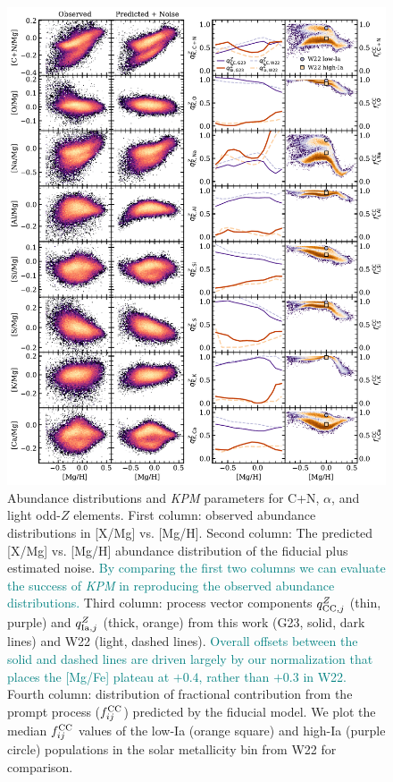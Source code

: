 \documentclass[modern]{aastex631}
\newcommand{\qcc}{q_{{\rm CC,}j}^{Z}}
\newcommand{\qIa}{q_{{\rm Ia,}j}^{Z}}
\newcommand{\fcc}{f_{ij}^{\rm CC}}
\newcommand{\add}[1]{\textcolor{teal}{#1}}
\newcommand{\name}{\textsl{KPM}}
\begin{document}
\begin{figure}[htb!]
    \centering
    \includegraphics[width=\textwidth]{Paper/Figures/all_param1.pdf}
    \caption{Abundance distributions and \name{} parameters for C+N, $\alpha$, and light odd-$Z$ elements. First column: observed abundance distributions in [X/Mg] vs. [Mg/H]. Second column: The predicted [X/Mg] vs. [Mg/H] abundance distribution of the fiducial plus estimated noise. \add{By comparing the first two columns we can evaluate the success of \name{} in reproducing the observed abundance distributions.} Third column: process vector components $\qcc$ (thin, purple) and $\qIa$ (thick, orange) from this work (G23, solid, dark lines) and W22 (light, dashed lines). \add{Overall offsets between the solid and dashed lines are driven largely by our normalization that places the [Mg/Fe] plateau at $+0.4$, rather than $+0.3$ in W22.} Fourth column: distribution of fractional contribution from the prompt process ($\fcc$) predicted by the fiducial model. We plot the median $\fcc$ values of the low-Ia (orange square) and high-Ia (purple circle) populations in the solar metallicity bin from W22 for comparison.}
    \label{fig:all_param1}
\end{figure}
\end{document}
